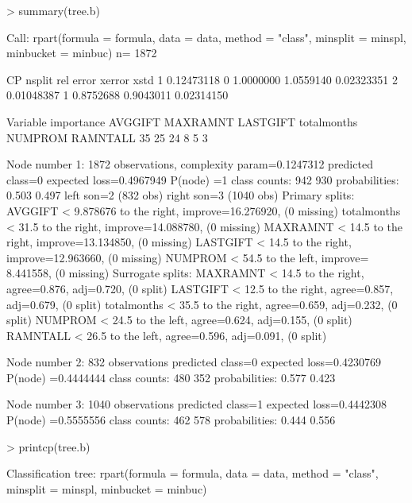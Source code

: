 \documentclass{article}
\begin{document}
\begin{Schunk}
\begin{Sinput}
> summary(tree.b)
\end{Sinput}
\begin{Soutput}
Call:
rpart(formula = formula, data = data, method = "class", minsplit = minspl, 
    minbucket = minbuc)
  n= 1872 

          CP nsplit rel error    xerror       xstd
1 0.12473118      0 1.0000000 1.0559140 0.02323351
2 0.01048387      1 0.8752688 0.9043011 0.02314150

Variable importance
    AVGGIFT    MAXRAMNT    LASTGIFT totalmonths     NUMPROM    RAMNTALL 
         35          25          24           8           5           3 

Node number 1: 1872 observations,    complexity param=0.1247312
  predicted class=0  expected loss=0.4967949  P(node) =1
    class counts:   942   930
   probabilities: 0.503 0.497 
  left son=2 (832 obs) right son=3 (1040 obs)
  Primary splits:
      AVGGIFT     < 9.878676 to the right, improve=16.276920, (0 missing)
      totalmonths < 31.5     to the right, improve=14.088780, (0 missing)
      MAXRAMNT    < 14.5     to the right, improve=13.134850, (0 missing)
      LASTGIFT    < 14.5     to the right, improve=12.963660, (0 missing)
      NUMPROM     < 54.5     to the left,  improve= 8.441558, (0 missing)
  Surrogate splits:
      MAXRAMNT    < 14.5     to the right, agree=0.876, adj=0.720, (0 split)
      LASTGIFT    < 12.5     to the right, agree=0.857, adj=0.679, (0 split)
      totalmonths < 35.5     to the right, agree=0.659, adj=0.232, (0 split)
      NUMPROM     < 24.5     to the left,  agree=0.624, adj=0.155, (0 split)
      RAMNTALL    < 26.5     to the left,  agree=0.596, adj=0.091, (0 split)

Node number 2: 832 observations
  predicted class=0  expected loss=0.4230769  P(node) =0.4444444
    class counts:   480   352
   probabilities: 0.577 0.423 

Node number 3: 1040 observations
  predicted class=1  expected loss=0.4442308  P(node) =0.5555556
    class counts:   462   578
   probabilities: 0.444 0.556 
\end{Soutput}
\begin{Sinput}
> printcp(tree.b)
\end{Sinput}
\begin{Soutput}
Classification tree:
rpart(formula = formula, data = data, method = "class", minsplit = minspl, 
    minbucket = minbuc)


\end{Soutput}
\end{Schunk}
\end{document}
